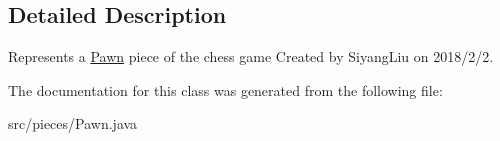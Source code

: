 \subsection{Detailed Description}
Represents a \mbox{\hyperlink{classpieces_1_1_pawn}{Pawn}} piece of the chess game Created by Siyang\+Liu on 2018/2/2. 

The documentation for this class was generated from the following file\+:\begin{DoxyCompactItemize}
\item 
src/pieces/Pawn.\+java\end{DoxyCompactItemize}
